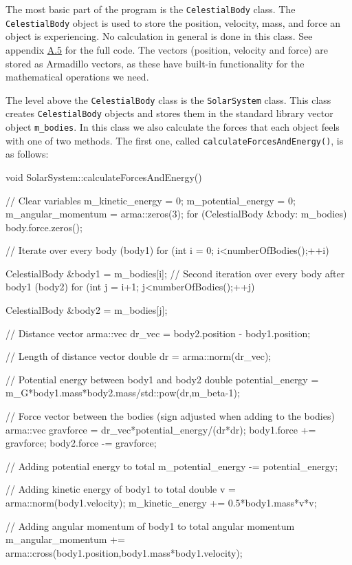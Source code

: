 \documentclass[reprint,english,notitlepage]{revtex4-1}  %
\begin{document}
The most basic part of the program is the \verb+CelestialBody+ class. The \verb+CelestialBody+ object is used to store the position, velocity, mass, and force an object is experiencing. No calculation in general is done in this class. See appendix \hyperref[A.5]{A.5} for the full code. The vectors (position, velocity and force) are stored as Armadillo \citep{Armadillo} vectors, as these have built-in functionality for the mathematical operations we need.

The level above the \verb+CelestialBody+ class is the \verb+SolarSystem+ class. This class creates \verb+CelestialBody+ objects and stores them in the standard library vector object \verb+m_bodies+. In this class we also calculate the forces that each object feels with one of two methods. The first one, called \verb+calculateForcesAndEnergy()+, is as follows:

\onecolumngrid
\begin{cpp}
void SolarSystem::calculateForcesAndEnergy() {
  // Clear variables
  m_kinetic_energy = 0;
  m_potential_energy = 0;
  m_angular_momentum = arma::zeros(3);
  for (CelestialBody &body: m_bodies) {
    body.force.zeros();
  }

  // Iterate over every body (body1)
  for (int i = 0; i<numberOfBodies();++i){
    CelestialBody &body1 = m_bodies[i];
    // Second iteration over every body after body1 (body2)
    for (int j = i+1; j<numberOfBodies();++j) {
      CelestialBody &body2 = m_bodies[j];

      // Distance vector
      arma::vec dr_vec = body2.position - body1.position;

      // Length of distance vector
      double dr = arma::norm(dr_vec);

      // Potential energy between body1 and body2
      double potential_energy = m_G*body1.mass*body2.mass/std::pow(dr,m_beta-1);

      // Force vector between the bodies (sign adjusted when adding to the bodies)
      arma::vec gravforce = dr_vec*potential_energy/(dr*dr);
      body1.force += gravforce;
      body2.force -= gravforce;

      // Adding potential energy to total
      m_potential_energy -= potential_energy;
    }

    // Adding kinetic energy of body1 to total
    double v = arma::norm(body1.velocity);
    m_kinetic_energy += 0.5*body1.mass*v*v;

    // Adding angular momentum of body1 to total angular momentum
    m_angular_momentum += arma::cross(body1.position,body1.mass*body1.velocity);
  }
}
\end{cpp}
\twocolumngrid
\end{document}
